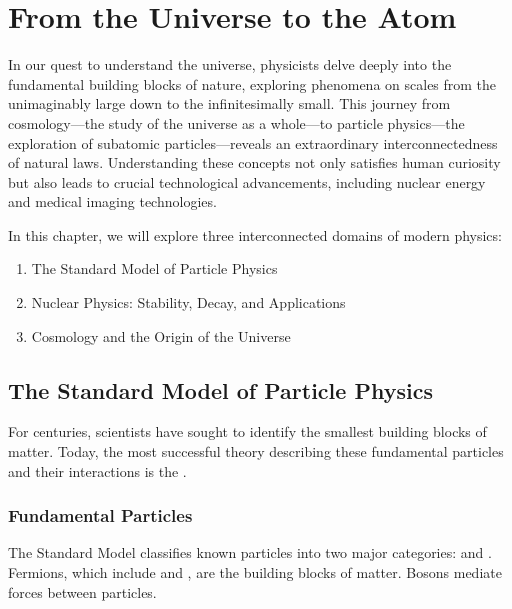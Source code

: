 \chapter{From the Universe to the Atom}

In our quest to understand the universe, physicists delve deeply into the fundamental building blocks of nature, exploring phenomena on scales from the unimaginably large down to the infinitesimally small. This journey from cosmology—the study of the universe as a whole—to particle physics—the exploration of subatomic particles—reveals an extraordinary interconnectedness of natural laws. Understanding these concepts not only satisfies human curiosity but also leads to crucial technological advancements, including nuclear energy and medical imaging technologies.

In this chapter, we will explore three interconnected domains of modern physics:
\begin{enumerate}
    \item The Standard Model of Particle Physics
    \item Nuclear Physics: Stability, Decay, and Applications
    \item Cosmology and the Origin of the Universe
\end{enumerate}

\section{The Standard Model of Particle Physics}
\FloatBarrier


For centuries, scientists have sought to identify the smallest building blocks of matter. Today, the most successful theory describing these fundamental particles and their interactions is the .

\subsection{Fundamental Particles}
\FloatBarrier

The Standard Model classifies known particles into two major categories:  and . Fermions, which include  and , are the building blocks of matter. Bosons mediate forces between particles.

